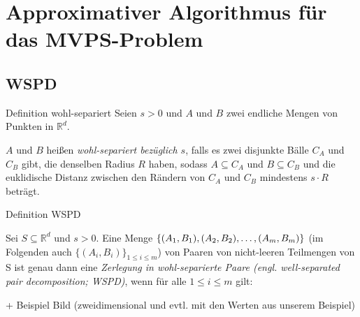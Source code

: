 \documentclass{beamer}
\begin{document}
	\section{Approximativer Algorithmus für das MVPS-Problem}
	\subsection{WSPD}
	\begin{frame}{Definition wohl-separiert}
		Seien $s > 0$ und $A$ und $B$ zwei endliche Mengen von Punkten in $\mathbb{R}^d$. 
		\begin{definition}
			$A$ und $B$ heißen \emph{wohl-separiert bezüglich $s$}, falls es zwei disjunkte Bälle $C_A$ und $C_B$ gibt, die denselben Radius $R$ haben, sodass $A \subseteq C_A$ und $B \subseteq C_B$ und die euklidische Distanz zwischen den Rändern von $C_A$ und $C_B$ mindestens $s\cdot R$ beträgt.
		\end{definition}
	\end{frame}
	
	\begin{frame}{Definition WSPD}
		\begin{definition}
			\label{def:wspd}
			Sei $S \subseteq \mathbb{R}^d$ und $s > 0$. 
			Eine Menge $ \{(A_1, B_1), (A_2, B_2), \mathellipsis, (A_m, B_m)\}$ (im Folgenden auch $\{(A_i, B_i)\}_{1 \leq i \leq m}$) von Paaren von nicht-leeren Teilmengen von S ist genau dann eine \emph{Zerlegung in wohl-separierte Paare (engl. well-separated pair decomposition; WSPD)}, wenn für alle $1 \leq i \leq m$ gilt:
		\end{definition}
		+ Beispiel Bild (zweidimensional und evtl. mit den Werten aus unserem Beispiel)
	\end{frame}
	
\end{document}
